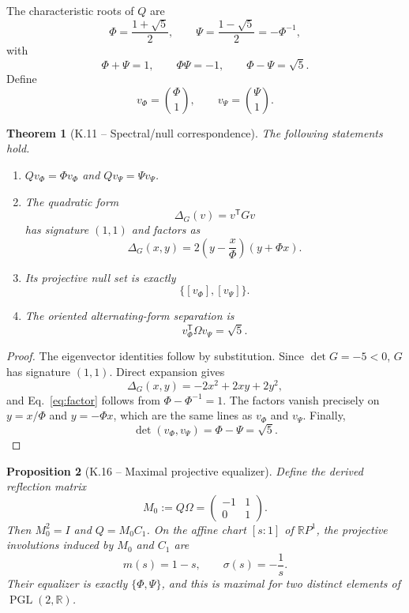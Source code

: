 \documentclass[11pt,letterpaper]{article}
\theoremstyle{kernelstyle}
\newtheorem{theorem}{Theorem}[section]
\newtheorem{proposition}[theorem]{Proposition}
\newcommand{\R}{\mathbb{R}}
\newcommand{\PGL}{\operatorname{PGL}}
\begin{document}
The characteristic roots of $Q$ are
\begin{equation}\label{eq:golden}
\Phi=\frac{1+\sqrt5}{2},
\qquad
\Psi=\frac{1-\sqrt5}{2}=-\Phi^{-1},
\end{equation}
with
\begin{equation}\label{eq:golden-relations}
\Phi+\Psi=1,
\qquad
\Phi\Psi=-1,
\qquad
\Phi-\Psi=\sqrt5.
\end{equation}
Define
\begin{equation}
 v_\Phi=\binom{\Phi}{1},
 \qquad
 v_\Psi=\binom{\Psi}{1}.
\end{equation}

\begin{theorem}[K.11 -- Spectral/null correspondence]\label{thm:golden}
The following statements hold.
\begin{enumerate}
  \item $Qv_\Phi=\Phi v_\Phi$ and $Qv_\Psi=\Psi v_\Psi$.
  \item The quadratic form
  \[
  \Delta_G(v)=v^{\mathsf T}Gv
  \]
  has signature $(1,1)$ and factors as
  \begin{equation}\label{eq:factor}
  \Delta_G(x,y)=2\left(y-\frac{x}{\Phi}\right)(y+\Phi x).
  \end{equation}
  \item Its projective null set is exactly
  \[
  \{[v_\Phi],[v_\Psi]\}.
  \]
  \item The oriented alternating-form separation is
  \begin{equation}\label{eq:separation}
  v_\Phi^{\mathsf T}\Omega v_\Psi=\sqrt5.
  \end{equation}
\end{enumerate}
\end{theorem}

\begin{proof}
The eigenvector identities follow by substitution.  Since $\det G=-5<0$, $G$ has signature $(1,1)$.  Direct expansion gives
\[
\Delta_G(x,y)=-2x^2+2xy+2y^2,
\]
and Eq.~\eqref{eq:factor} follows from $\Phi-\Phi^{-1}=1$.  The factors vanish precisely on $y=x/\Phi$ and $y=-\Phi x$, which are the same lines as $v_\Phi$ and $v_\Psi$.  Finally,
\[
\det(v_\Phi,v_\Psi)=\Phi-\Psi=\sqrt5.
\]
\end{proof}

\begin{proposition}[K.16 -- Maximal projective equalizer]\label{prop:equalizer}
Define the derived reflection matrix
\begin{equation}
M_0:=Q\Omega=
\begin{pmatrix}-1&1\\0&1\end{pmatrix}.
\end{equation}
Then $M_0^2=I$ and $Q=M_0C_1$.  On the affine chart $[s:1]$ of $\R P^1$, the projective involutions induced by $M_0$ and $C_1$ are
\begin{equation}
 m(s)=1-s,
 \qquad
 \sigma(s)=-\frac1s.
\end{equation}
Their equalizer is exactly $\{\Phi,\Psi\}$, and this is maximal for two distinct elements of $\PGL(2,\R)$.
\end{proposition}
\end{document}

